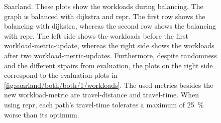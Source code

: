         \begin{figure}[hbp]
            \centering%
            \hfill%

            \hfill%
            \caption[Workloads during balancing Saarland in comparison]{%
                Saarland.
                These plots show the workloads during \gls{balancing}.
                The graph is balanced with \gls{dijkstra} and \gls{repr}.
                The first row shows the \gls{balancing} with \gls{dijkstra}, whereas the second row shows the \gls{balancing} with \gls{repr}.
                The left side shows the workloads before the first workload-\gls{metric}-update, whereas the right side shows the workloads after two workload-\gls{metric}-updates.
                Furthermore, despite randomness and the different \glspl{stpair} from evaluation, the plots on the right side correspond to the evaluation-plots in \vref{fig:saarland/both/both/1/workloads}.
                The used \glspl{metric} besides the new workload-\gls{metric} are travel-distance and travel-time.
                When using \gls{repr}, each path's travel-time tolerates a maximum of \si{\num{25} \percent} worse than its optimum.
                \label{fig:saarland/both/0/workloads}
                \label{fig:saarland/both/2/workloads}
            }
        \end{figure}

